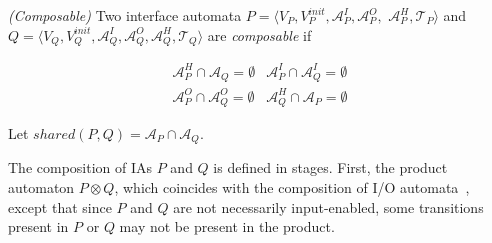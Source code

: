 \begin{definition}\label{def:composable}\emph{(Composable)}
Two interface automata $P=\langle V_P, V_P^{init}, \mathcal{A}_P^I,
\mathcal{A}_P^O, $ $\mathcal{A}_P^H, \mathcal{T}_P \rangle$ and
$Q=\langle V_Q, V_Q^{init}, \mathcal{A}_Q^I, \mathcal{A}_Q^O,
\mathcal{A}_Q^H, \mathcal{T}_Q \rangle$ are \emph{composable} if
\begin{center}
\begin{displaymath}
    \begin{array}{cc}
     \mathcal{A}_P^H \cap \mathcal{A}_Q = \emptyset & \mathcal{A}_P^I \cap \mathcal{A}_Q^I = \emptyset \\
     \mathcal{A}_P^O \cap \mathcal{A}_Q^O = \emptyset & \mathcal{A}_Q^H \cap \mathcal{A}_P = \emptyset
    \end{array}
\end{displaymath}
\end{center}
Let $shared(P, Q)= \mathcal{A}_P \cap \mathcal{A}_Q$.
\end{definition}

The composition of IAs $P$ and $Q$ is defined in stages. First, the
product automaton $P\otimes Q$, which coincides with the
composition of I/O automata~\cite{Lynch:1987:HCP:41840.41852},
except that since $P$ and $Q$ are not necessarily input-enabled,
some transitions present in $P$ or $Q$ may not be present in the
product.

